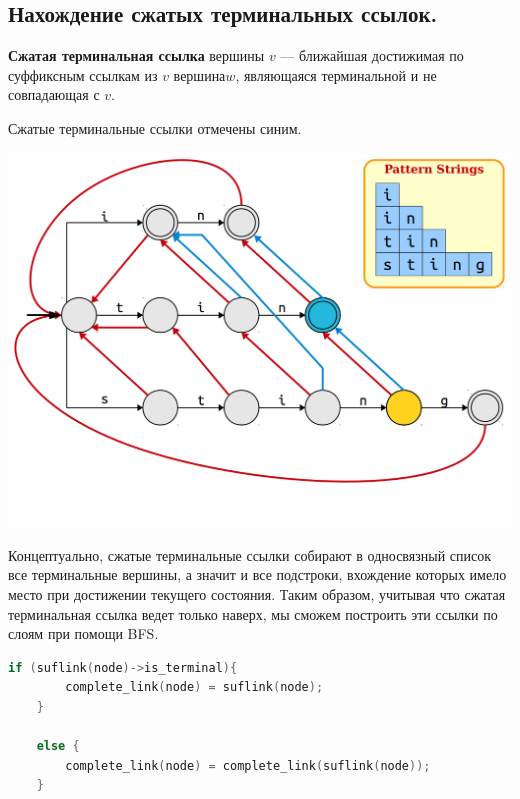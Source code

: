 \subsection{Нахождение сжатых терминальных ссылок.}
\begin{Def}
    \textbf{Сжатая терминальная ссылка} вершины $v$ --- ближайшая достижимая по суффиксным ссылкам из $v$ вершина$w$, являющаяся терминальной и не совпадающая с $v$.
\end{Def}

\begin{example} 

Сжатые терминальные ссылки отмечены синим.
\begin{center}
\includegraphics[scale = 0.3]{"images/lect06/Aho-Corasick-complete-links.png"}
\end{center}
\end{example}

Концептуально, сжатые терминальные ссылки собирают в односвязный список все терминальные вершины, а значит и все подстроки, вхождение которых имело место при достижении текущего состояния.
Таким образом, учитывая что сжатая терминальная ссылка ведет только наверх, мы сможем построить эти ссылки по слоям при помощи BFS.
\newpage
\begin{lstlisting}[language = C++]
    if (suflink(node)->is_terminal){
        complete_link(node) = suflink(node);
    }

    else {
        complete_link(node) = complete_link(suflink(node));
    }
\end{lstlisting}

